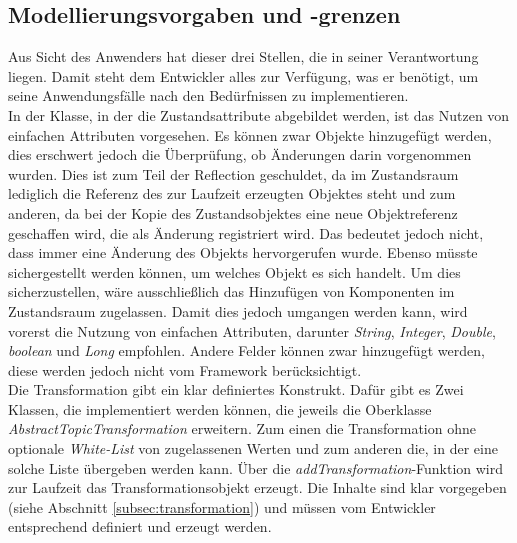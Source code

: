     \subsection{Modellierungsvorgaben und -grenzen}
    \label{subsec:modellierungsgrenzen}
        Aus Sicht des Anwenders hat dieser drei Stellen, die in seiner Verantwortung liegen. Damit steht  
        dem Entwickler alles zur Verfügung, was er benötigt, um seine Anwendungsfälle nach den Bedürfnissen zu implementieren. 
        \\
        \linebreak
        In der Klasse, in der die Zustandsattribute abgebildet werden, ist das Nutzen von einfachen Attributen vorgesehen. Es können 
        zwar Objekte hinzugefügt werden, dies erschwert jedoch die Überprüfung, ob Änderungen darin vorgenommen wurden. 
        Dies ist zum Teil der Reflection geschuldet, da im Zustandsraum lediglich die Referenz des zur Laufzeit erzeugten Objektes 
        steht und zum anderen, da bei der Kopie des Zustandsobjektes eine neue Objektreferenz geschaffen wird, die als Änderung 
        registriert wird. Das bedeutet jedoch nicht, dass immer eine Änderung des Objekts hervorgerufen wurde. Ebenso müsste sichergestellt 
        werden können, um welches Objekt es sich handelt. Um dies sicherzustellen, wäre ausschließlich das Hinzufügen von Komponenten im 
        Zustandsraum zugelassen. Damit dies jedoch umgangen werden kann, wird vorerst die Nutzung von einfachen Attributen, darunter 
        \textit{String}, \textit{Integer}, \textit{Double}, \textit{boolean} und \textit{Long} empfohlen. Andere Felder können zwar hinzugefügt werden, 
        diese werden jedoch nicht vom Framework berücksichtigt.
        \\
        \linebreak
        Die Transformation gibt ein klar definiertes Konstrukt. Dafür gibt es Zwei Klassen, die implementiert werden können, die 
        jeweils die Oberklasse \textit{AbstractTopicTransformation} erweitern. Zum einen die Transformation ohne 
        optionale \textit{White-List} von zugelassenen Werten und zum anderen die, in der eine solche Liste übergeben werden kann. Über die 
        \textit{addTransformation}-Funktion wird zur Laufzeit das Transformationsobjekt erzeugt. Die Inhalte sind klar vorgegeben (siehe Abschnitt \ref{subsec:transformation}) 
        und müssen vom Entwickler entsprechend definiert und erzeugt werden.
        \\
        \linebreak
